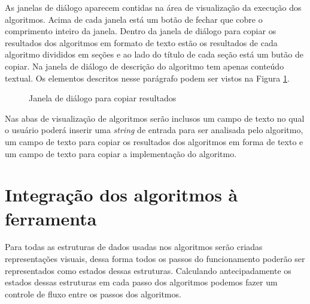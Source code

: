 As janelas de diálogo aparecem contidas na área de visualização da execução dos algoritmos. Acima de cada janela está um botão de fechar que cobre o comprimento inteiro da janela. Dentro da janela de diálogo para copiar os resultados dos algoritmos em formato de texto estão os resultados de cada algoritmo divididos em seções e ao lado do título de cada seção está um butão de copiar. Na janela de diálogo de descrição do algoritmo tem apenas conteúdo textual. Os elementos descritos nesse parágrafo podem ser vistos na Figura \ref{fig:mpopup}.

\begin{figure}[ht]
  \centering
  \captionsetup{width=16cm}
  \caption{Janela de diálogo para copiar resultados}
  \label{fig:mpopup}
\end{figure}

Nas abas de visualização de algoritmos serão inclusos um campo de texto no qual o usuário poderá inserir uma \textit{string} de entrada para ser analisada pelo algoritmo, um campo de texto para copiar os resultados dos algoritmos em forma de texto e um campo de texto para copiar a implementação do algoritmo.

\section{Integração dos algoritmos à ferramenta}
Para todas as estruturas de dados usadas nos algoritmos serão criadas representações visuais, dessa forma todos os passos do funcionamento poderão ser representados como estados dessas estruturas. Calculando antecipadamente os estados dessas estruturas em cada passo dos algoritmos podemos fazer um controle de fluxo entre os passos dos algoritmos.

